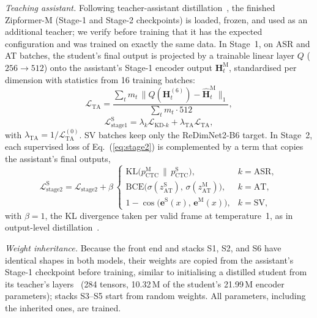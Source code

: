 \documentclass[lettersize,journal]{IEEEtran}
\begin{document}
\textit{Teaching assistant.} Following teacher-assistant distillation~\cite{mirzadeh2020takd}, the finished Zipformer-M (Stage-1 and Stage-2 checkpoints) is loaded, frozen, and used
as an additional teacher; we verify before training that it has the expected configuration and was trained on
exactly the same data. In Stage~1, on ASR and AT batches, the student's final output is projected by a trainable
linear layer $Q$ ($256\to512$) onto the assistant's Stage-1 encoder output $\mathbf{H}^{\text{M}}_t$, standardised
per dimension with statistics from 16 training batches:
\begin{equation}
  \mathcal{L}_{\text{TA}} = \frac{\sum_t m_t \,\big\| Q(\mathbf{H}^{(6)}_{t}) - \hat{\mathbf{H}}^{\text{M}}_{t} \big\|_1}{\sum_t m_t \cdot 512},
  \label{eq:ta}
\end{equation}
\begin{equation}
  \mathcal{L}_{\text{stage1}}^{\text{S}} = \lambda_k\mathcal{L}_{\text{KD-}k} + \lambda_{\text{TA}}\mathcal{L}_{\text{TA}},
  \label{eq:ta1}
\end{equation}
with $\lambda_{\text{TA}}=1/\mathcal{L}^{(0)}_{\text{TA}}$. SV batches keep only the ReDimNet2-B6 target. In Stage~2,
each supervised loss of Eq.~(\ref{eq:stage2}) is complemented by a term that copies the assistant's final outputs,
\begin{equation}
  \mathcal{L}_{\text{stage2}}^{\text{S}} = \mathcal{L}_{\text{stage2}} + \beta\,
  \begin{cases}
    \mathrm{KL}\big(p^{\text{M}}_{\text{CTC}}\,\|\,p^{\text{S}}_{\text{CTC}}\big), & k=\text{ASR},\\
    \mathrm{BCE}\big(\sigma(z^{\text{S}}_{\text{AT}}),\,\sigma(z^{\text{M}}_{\text{AT}})\big), & k=\text{AT},\\
    1-\cos\big(\mathbf{e}^{\text{S}}(x),\,\mathbf{e}^{\text{M}}(x)\big), & k=\text{SV},
  \end{cases}
  \label{eq:ta2}
\end{equation}
with $\beta=1$, the KL divergence taken per valid frame at temperature~1, as in output-level distillation~\cite{hinton2014distilling}.

\textit{Weight inheritance.} Because the front end and stacks S1, S2, and S6 have identical shapes in both models,
their weights are copied from the assistant's Stage-1 checkpoint before training, similar to initialising a distilled student from its teacher's layers~\cite{sanh2019distilbert} (284 tensors, 10.32\,M of the
student's 21.99\,M encoder parameters); stacks S3--S5 start from random weights. All parameters, including the
inherited ones, are trained.
\end{document}
